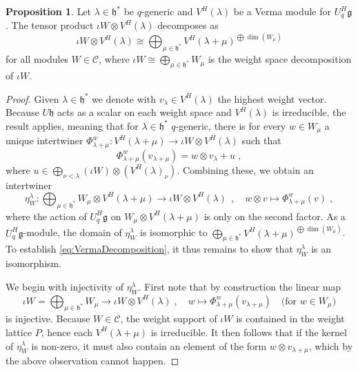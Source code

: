 \documentclass[12pt,dvipsnames]{article}
\numberwithin{equation}{section}
\theoremstyle{definition}
\newtheorem{proposition}[definition]{Proposition}
\newcommand{\cat}[1]{\mathcal{#1}}
\newcommand{\1}{\ensuremath{\mathbbm{1}}}
\begin{document}
\begin{proposition}\label{prop: Verma tensor finite}
    Let $\lambda\in\mathfrak{h}^\ast$ be $q$-generic and $V^H(\lambda)$ be a Verma module for $U_q^H\mathfrak{g}$. The tensor product $\iota W\otimes V^H(\lambda)$ decomposes as
    \begin{equation}\label{eq:VermaDecomposition}
        \iota W\otimes V^H(\lambda)\cong\bigoplus_{\mu\in\mathfrak{h}^\ast} V^H(\lambda+\mu)^{\bigoplus\dim(W_\mu)}
    \end{equation}
    for all modules $W\in\cat{C}$, where $\iota W \cong \bigoplus_{\mu\in\mathfrak{h}^\ast} W_\mu$ is the weight space decomposition of $\iota W$.
\end{proposition}
\begin{proof}
    Given $\lambda\in\mathfrak{h}^\ast$ we denote with $v_\lambda\in V^H(\lambda)$ the highest weight vector.
    Because $U\mathfrak{h}$ acts as a scalar on each weight space and $V^H(\lambda)$ is irreducible, the result \cite[Prop.\,2.2]{ES99} applies, meaning that for $\lambda\in\mathfrak{h}^\ast$ $q$-generic, there is for every $w\in W_\mu$ a unique intertwiner $\Phi_{\lambda+\mu}^w:V^H(\lambda+\mu)\to \iota W \otimes V^H(\lambda)$ such that
    \begin{equation}\label{eq:VermaDecompA}
        \Phi_{\lambda+\mu}^w(v_{\lambda+\mu}) = w\otimes v_\lambda + u \;,
    \end{equation}
    where $u\in \bigoplus_{\nu<\lambda}(\iota W)\otimes (V^H(\lambda)_\nu)$.
    Combining these, we obtain an intertwiner 
    \begin{equation}\label{eq:VermaDecompB}
        \eta_W^\lambda:\bigoplus_{\mu\in\mathfrak{h}^\ast} W_\mu\otimes V^H(\lambda+\mu)  \to \iota W\otimes V^H(\lambda) 
        ~~,\quad
        w\otimes v \mapsto \Phi^w_{\lambda+\mu}(v)
        \;,
    \end{equation}
where the action of $U_q^H\mathfrak{g}$ on $W_\mu\otimes V^H(\lambda+\mu)$ is only on the second factor.
As a $U_q^H\mathfrak{g}$-module, the domain of $\eta_W^\lambda$ is isomorphic to 
$\bigoplus_{\mu\in\mathfrak{h}^\ast} V^H(\lambda+\mu)^{\bigoplus\dim(W_\mu)}$. To establish \eqref{eq:VermaDecomposition}, it thus remains to show that $\eta_W^\lambda$ is an isomorphism. 
    
We begin with injectivity of $\eta^\lambda_W$. 
First note that by construction the linear map     
    \begin{equation}
        \iota W = \bigoplus_{\mu\in\mathfrak{h}^\ast} W_\mu \to \iota W\otimes V^H(\lambda) \;, \quad w \mapsto \Phi_{\lambda+\mu}^w(v_{\lambda+\mu})
        \quad \text{(for $w \in W_\mu$)}
    \end{equation}
is injective. Because $W\in\cat{C}$, the weight support of $\iota W$ is contained in the weight lattice $P$, hence each $V^H(\lambda+\mu)$ is irreducible. It then follows that if the kernel of $\eta^\lambda_W$ is non-zero, it must also contain an element of the form $w \otimes v_{\lambda+\mu}$, which by the above observation cannot happen. 
    

\end{proof}
\end{document}
